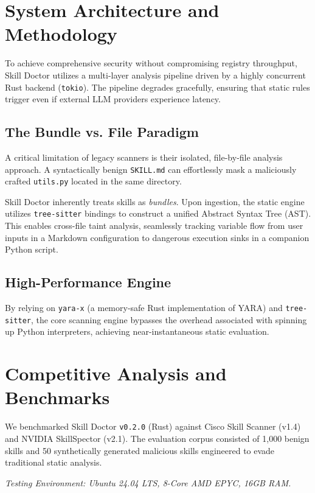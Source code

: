 \documentclass[11pt,a4paper]{article}
\begin{document}
\section{System Architecture and Methodology}

To achieve comprehensive security without compromising registry throughput, Skill Doctor utilizes a multi-layer analysis pipeline driven by a highly concurrent Rust backend (\texttt{tokio}). The pipeline degrades gracefully, ensuring that static rules trigger even if external LLM providers experience latency.

\subsection{The Bundle vs. File Paradigm}

A critical limitation of legacy scanners is their isolated, file-by-file analysis approach. A syntactically benign \texttt{SKILL.md} can effortlessly mask a maliciously crafted \texttt{utils.py} located in the same directory.

Skill Doctor inherently treats skills as \textit{bundles}. Upon ingestion, the static engine utilizes \texttt{tree-sitter} bindings to construct a unified Abstract Syntax Tree (AST). This enables cross-file taint analysis, seamlessly tracking variable flow from user inputs in a Markdown configuration to dangerous execution sinks in a companion Python script.

\subsection{High-Performance Engine}

By relying on \texttt{yara-x} (a memory-safe Rust implementation of YARA) and \texttt{tree-sitter}, the core scanning engine bypasses the overhead associated with spinning up Python interpreters, achieving near-instantaneous static evaluation.

\section{Competitive Analysis and Benchmarks}

We benchmarked Skill Doctor \texttt{v0.2.0} (Rust) against Cisco Skill Scanner (v1.4) and NVIDIA SkillSpector (v2.1). The evaluation corpus consisted of 1,000 benign skills and 50 synthetically generated malicious skills engineered to evade traditional static analysis.

\textit{Testing Environment: Ubuntu 24.04 LTS, 8-Core AMD EPYC, 16GB RAM.}
\end{document}

